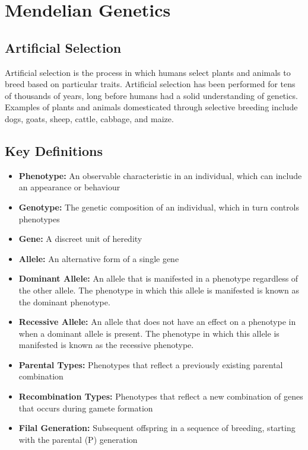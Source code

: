 \documentclass[12pt,titlepage]{article}
\begin{document}
  \section{Mendelian Genetics}
    \subsection{Artificial Selection}
      Artificial selection is the process in which humans select plants and animals to breed based 
      on particular traits. Artificial selection has been performed for tens of thousands of years,
      long before humans had a solid understanding of genetics. Examples of plants and animals domesticated
      through selective breeding include dogs, goats, sheep, cattle, cabbage, and maize.

    \subsection{Key Definitions}
      \begin{itemize}
        \item \textbf{Phenotype:} An observable characteristic in an individual, which can include an appearance or behaviour
        \item \textbf{Genotype:} The genetic composition of an individual, which in turn controls phenotypes
        \item \textbf{Gene:} A discreet unit of heredity
        \item \textbf{Allele:} An alternative form of a single gene
        \item \textbf{Dominant Allele:} An allele that is manifested in a phenotype regardless of the other allele.
        The phenotype in which this allele is manifested is known as the dominant phenotype.
        \item \textbf{Recessive Allele:} An allele that does not have an effect on a phenotype in when a dominant allele is present.
        The phenotype in which this allele is manifested is known as the recessive phenotype.
        \item \textbf{Parental Types:} Phenotypes that reflect a previously existing parental combination
        \item \textbf{Recombination Types:} Phenotypes that reflect a new combination of genes that occurs during gamete formation
        \item \textbf{Filal Generation:} Subsequent offspring in a sequence of breeding, starting with the parental (P) generation
      \end{itemize}
\end{document}
